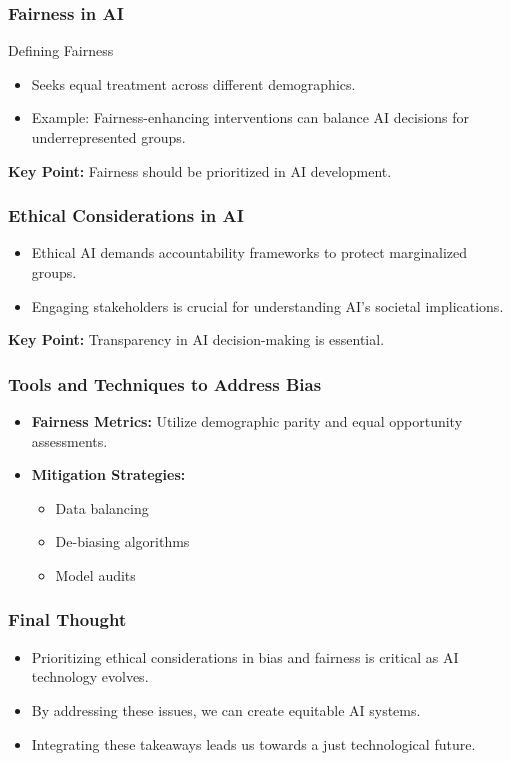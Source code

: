 \documentclass{beamer}
\begin{document}
\begin{frame}[fragile]
    \frametitle{Fairness in AI}
    \begin{block}{Defining Fairness}
        \begin{itemize}
            \item Seeks equal treatment across different demographics.
            \item Example: Fairness-enhancing interventions can balance AI decisions for underrepresented groups.
        \end{itemize}
    \end{block}
    \textbf{Key Point:} Fairness should be prioritized in AI development.
\end{frame}

\begin{frame}[fragile]
    \frametitle{Ethical Considerations in AI}
    \begin{itemize}
        \item Ethical AI demands accountability frameworks to protect marginalized groups.
        \item Engaging stakeholders is crucial for understanding AI's societal implications.
    \end{itemize}
    \textbf{Key Point:} Transparency in AI decision-making is essential.
\end{frame}

\begin{frame}[fragile]
    \frametitle{Tools and Techniques to Address Bias}
    \begin{itemize}
        \item \textbf{Fairness Metrics:} Utilize demographic parity and equal opportunity assessments.
        \item \textbf{Mitigation Strategies:}
          \begin{itemize}
              \item Data balancing
              \item De-biasing algorithms
              \item Model audits
          \end{itemize}
    \end{itemize}
\end{frame}

\begin{frame}[fragile]
    \frametitle{Final Thought}
    \begin{itemize}
        \item Prioritizing ethical considerations in bias and fairness is critical as AI technology evolves.
        \item By addressing these issues, we can create equitable AI systems.
        \item Integrating these takeaways leads us towards a just technological future.
    \end{itemize}
\end{frame}
\end{document}
